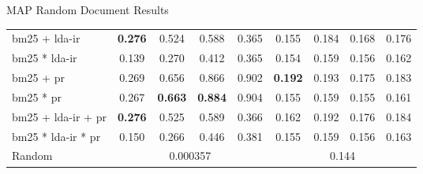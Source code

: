 \begin{frame}{\insertsection}{\insertsubsection}
\begin{block}{MAP Random Document Results}
\begin{table}
{\begin{tabular}{l|c|c|c|c|c|c|c|c}
				\acrshort{bm25} + \acrshort{lda}-\acrshort{ir} & \textbf{0.276} & 0.524 & 0.588 & 0.365 & 0.155 & 0.184 & 0.168 & 0.176 \\
				\acrshort{bm25} * \acrshort{lda}-\acrshort{ir} & 0.139 & 0.270 & 0.412 & 0.365 & 0.154 & 0.159 & 0.156 & 0.162 \\
				\acrshort{bm25} + \acrshort{pr} & 0.269 & 0.656 & 0.866 & 0.902 & \textbf{0.192} & 0.193 & 0.175 & 0.183 \\
				\acrshort{bm25} * \acrshort{pr} & 0.267 & \textbf{0.663} & \textbf{0.884} & 0.904 & 0.155 & 0.159 & 0.155 & 0.161 \\
				\acrshort{bm25} + \acrshort{lda}-\acrshort{ir} + \acrshort{pr} & \textbf{0.276} & 0.525 & 0.589 & 0.366 & 0.162 & 0.192 & 0.176 & 0.184 \\
				\acrshort{bm25} * \acrshort{lda}-\acrshort{ir} * \acrshort{pr} & 0.150 & 0.266 & 0.446 & 0.381 & 0.155 & 0.159 & 0.156 & 0.163 \\
				\rowcolor{red!30}Random & \multicolumn{4}{c|}{0.000357} & \multicolumn{4}{c|}{0.144} \\
			\end{tabular}
		}
		\end{table}
	\end{block}
\end{frame}

